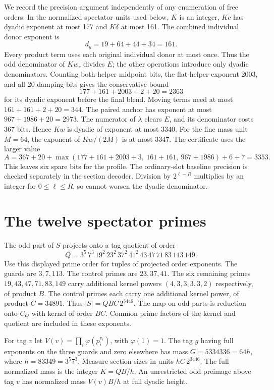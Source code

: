 We record the precision argument independently of any enumeration of
free orders.  In the normalized spectator units used below, $K$ is an
integer, $Kc$ has dyadic exponent at most 177 and $K\delta$ at most 161.
The combined individual donor exponent is
\[
 d_y=19+64+44+34=161.
\]
Every product term uses each original individual donor at most once.
Thus the odd denominator of $Kw_r$ divides $E$; the other operations
introduce only dyadic denominators.  Counting both helper midpoint bits,
the flat-helper exponent 2003, and all 20 damping bits gives the
conservative bound
\[
 177+161+2003+2+20=2363
\]
for its dyadic exponent before the final blend.  Moving terms need
at most $161+161+2+20=344$.  The paired anchor has exponent at most
$967+1986+20=2973$.  The numerator of $\lambda$ clears $E$, and its
denominator costs 367 bits.  Hence $Kw$ is dyadic of exponent at most
$3340$.  For the fine mass unit $M=64$, the exponent of $Kw/(2M)$ is
at most $3347$.  The certificate uses the larger value
\begin{equation}\label{h100:fine-precision}
 A=367+20+
 \max(177+161+2003+3,\ 161+161,\ 967+1986)+6+7=3353.
\end{equation}
This leaves six spare bits for the profile.  The ordinary-slot baseline
precision is checked separately in the section decoder.  Division by
$2^{\ell-R}$ multiplies by an integer for $0\le\ell\le R$, so cannot
worsen the dyadic denominator.

\section{The twelve spectator primes}\label{h100:spectator}

The odd part of \(S\) projects onto a tag quotient of order \[
 Q=3^5\,7^3\,19^2\,23^2\,37^2\,41^2\,43\,47\,71\,83\,113\,149 .
\] Use this displayed prime order for tuples of projected order exponents. The guards are \(3,7,113\). The control primes are \(23,37,41\). The six remaining primes \(19,43,47,71,83,149\) carry additional kernel powers \((4,3,3,3,3,2)\) respectively, of product \(B\). The control primes each carry one additional kernel power, of product \(C=34891\). Thus \(|S|=QBC\,2^{3446}\). The map on odd parts is reduction onto \(C_Q\) with kernel of order \(BC\). Common prime factors of the kernel and quotient are included in these exponents.

For tag \(v\) let \(V(v)=\prod_i\varphi(p_i^{v_i})\), with \(\varphi(1)=1\). The tag \(g\) having full exponents on the three guards and zero elsewhere has mass \(G=5334336=64h\), where \(h=83349=3^5 7^3\). Measure section sizes in units \(hC\,2^{3446}\). The full normalized mass is the integer \(K=QB/h\). An unrestricted odd preimage above tag \(v\) has normalized mass \(V(v)B/h\) at full dyadic height.

